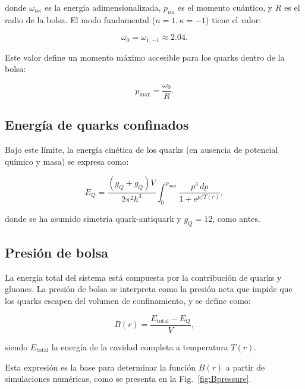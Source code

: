 donde \( \omega_{n\kappa} \) es la energía adimensionalizada, \( p_{n\kappa} \) es el momento cuántico, y \( R \) es el radio de la bolsa. El modo fundamental (\( n = 1, \kappa = -1 \)) tiene el valor:

\begin{equation}
\omega_0 = \omega_{1, -1} \approx 2.04.
\end{equation}

Este valor define un momento máximo accesible para los quarks dentro de la bolsa:

\begin{equation}
p_{\text{max}} = \frac{\omega_0}{R}.
\end{equation}

\subsection{Energía de quarks confinados}

Bajo este límite, la energía cinética de los quarks (en ausencia de potencial químico y masa) se expresa como:

\begin{equation}
E_Q = \frac{(g_Q + g_{\bar{Q}}) V}{2\pi^2 \hbar^3} \int_0^{p_{\text{max}}} \frac{p^3 \, dp}{1 + e^{p/T(r)}},
\end{equation}

donde se ha asumido simetría quark-antiquark y \( g_Q = 12 \), como antes.

\subsection{Presión de bolsa}

La energía total del sistema está compuesta por la contribución de quarks y gluones. La presión de bolsa se interpreta como la presión neta que impide que los quarks escapen del volumen de confinamiento, y se define como:

\begin{equation}
B(r) = \frac{E_{\text{total}} - E_Q}{V},
\end{equation}

siendo \( E_{\text{total}} \) la energía de la cavidad completa a temperatura \( T(r) \).

Esta expresión es la base para determinar la función \( B(r) \) a partir de simulaciones numéricas, como se presenta en la Fig.~\ref{fig:Bpressure}.
